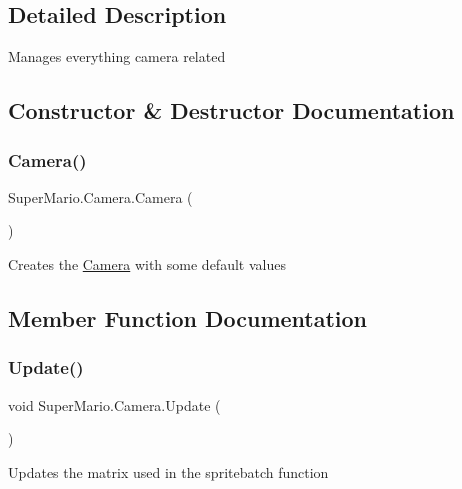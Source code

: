 \subsection{Detailed Description}
Manages everything camera related 



\subsection{Constructor \& Destructor Documentation}
\mbox{\label{class_super_mario_1_1_camera_a5828416f8cef0538d1fe07bb31bf5f69}} 
\subsubsection{\texorpdfstring{Camera()}{Camera()}}
{\footnotesize\ttfamily Super\+Mario.\+Camera.\+Camera (\begin{DoxyParamCaption}{ }\end{DoxyParamCaption})}



Creates the \mbox{\hyperlink{class_super_mario_1_1_camera}{Camera}} with some default values 



\subsection{Member Function Documentation}
\mbox{\label{class_super_mario_1_1_camera_a0fb046d2afebef6dd9a6507505909ec3}} 
\subsubsection{\texorpdfstring{Update()}{Update()}}
{\footnotesize\ttfamily void Super\+Mario.\+Camera.\+Update (\begin{DoxyParamCaption}{ }\end{DoxyParamCaption})}



Updates the matrix used in the spritebatch function 



